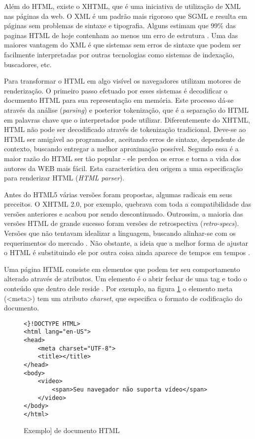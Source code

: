 Além do HTML, existe o XHTML, que é uma iniciativa de utilização de
XML nas páginas da web. O XML é um padrão mais rigoroso que SGML e
resulta em páginas sem problemas de sintaxe e tipografia. 
Alguns estimam que 99\% das paginas HTML de hoje
contenham ao menos um erro de estrutura \autocite{diveIntohtml}.
Uma das maiores vantagem do XML é que sistemas sem erros de sintaxe
que podem ser facilmente interpretadas por outras tecnologias como
sistemas de indexação, buscadores, etc.

Para transformar o HTML em algo visível os navegadores utilizam motores
de renderização. O primeiro passo efetuado por esses sistemas é
decodificar o documento HTML para sua representação em memória. Este
processo dá-se através da análise (\textit{parsing}) e posterior
tokenização, que é a separação do HTML em palavras chave que o
interpretador pode utilizar. Diferentemente do XHTML, HTML não pode
ser decodificado através de tokenização tradicional. Deve-se ao HTML
ser amigável ao programador, aceitando erros de sintaxe, dependente
de contexto, buscando entregar a melhor aproximação possível. 
Segundo \cite{howBrowsersWork} essa é a maior razão do HTML ser tão popular - 
ele perdoa os erros e torna a vida dos autores da WEB mais fácil. Esta
característica deu origem a uma especificação para renderizar HTML
(\textit{HTML parser}).

Antes do HTML5 várias versões foram propostas, algumas radicais
em seus preceitos. O XHTML 2.0, por exemplo, quebrava com toda
a compatibilidade das versões anteriores e acabou por sendo descontinuado.
Outrossim, a maioria das versões HTML de grande sucesso foram versões de
retrospectiva (\textit{retro-specs}). Versões que não tentavam
idealizar a linguagem, buscando alinhar-se com os requerimentos do
mercado \autocite{diveIntohtml}. Não obstante, a ideia que a melhor forma
de ajustar o HTML é substituindo ele por outra coisa ainda aparece de tempos
em tempos \autocite{diveIntohtml}.

Uma página HTML consiste em elementos que podem ter seu comportamento
alterado através de atributos. Um elemento é o abrir fechar de
uma tag e todo o conteúdo que dentro dele reside \autocite[pp.
10--11]{htmlAndCssDucket}. Por exemplo, na figura \ref{fig:htmlSample} o elemento
meta (<meta>) tem um atributo \textit{charset}, que especifica o formato de 
codificação do documento.

\begin{figure}
\centering
\begin{verbatim}
<}!DOCTYPE HTML>
<html lang="en-US">
<head>
	<meta charset="UTF-8">
	<title></title>
</head>
<body>
    <video>
        <span>Seu navegador não suporta vídeo</span>
    </video>
</body>
</html>
\end{verbatim}
\caption{Exemplo] de documento HTML}
\label{fig:htmlSample}
\end{figure}


